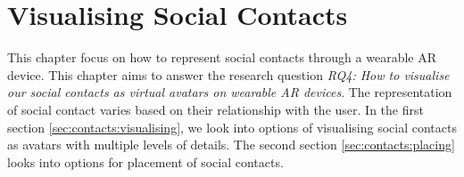 \chapter{Visualising Social Contacts}
\label{ch:contacts} 

This chapter focus on how to represent social contacts through a wearable AR device. 
This chapter aims to answer the research question \textit{RQ4: How to visualise our social contacts as virtual avatars on wearable AR devices}.
The representation of social contact varies based on their relationship with the user. 
In the first section \ref{sec:contacts:visualising}, we look into options of visualising social contacts as avatars with multiple levels of details. The second section \ref{sec:contacts:placing} looks into options for placement of social contacts. 




